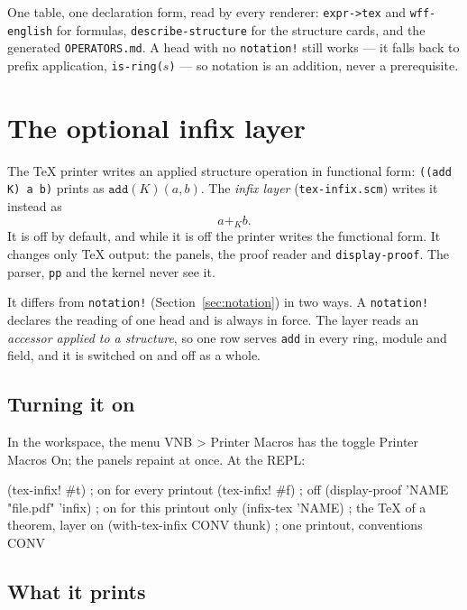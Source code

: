 One table, one declaration form, read by every renderer: \texttt{expr->tex} and
\texttt{wff-english} for formulas, \texttt{describe-structure} for the structure
cards, and the generated \texttt{OPERATORS.md}.  A head with no
\texttt{notation!} still works --- it falls back to prefix application,
\texttt{is-ring($s$)} --- so notation is an addition, never a prerequisite.

\section{The optional infix layer}
\label{sec:infix-layer}

The TeX printer writes an applied structure operation in functional
form: \texttt{((add K) a b)} prints as $\mathtt{add}(K)(a, b)$.  The
\emph{infix layer} (\texttt{tex-infix.scm}) writes it instead as
\[
  a +_K b .
\]
It is off by default, and while it is off the printer writes the
functional form.  It changes only TeX output: the panels, the
proof reader and \texttt{display-proof}.  The parser, \texttt{pp} and
the kernel never see it.

It differs from \texttt{notation!} (Section~\ref{sec:notation}) in
two ways.  A \texttt{notation!} declares the reading of one head and is
always in force.  The layer reads an \emph{accessor applied to a
structure}, so one row serves \texttt{add} in every ring, module and
field, and it is switched on and off as a whole.

\subsection{Turning it on}

In the workspace, the menu \textsf{VNB > Printer Macros} has the
toggle \textsf{Printer Macros On}; the panels repaint at once.  At the
REPL:
\begin{VNBcode}
(tex-infix! #t)                          ; on for every printout
(tex-infix! #f)                          ; off
(display-proof 'NAME "file.pdf" 'infix)  ; on for this printout only
(infix-tex 'NAME)                        ; the TeX of a theorem, layer on
(with-tex-infix CONV thunk)              ; one printout, conventions CONV
\end{VNBcode}

\subsection{What it prints}

